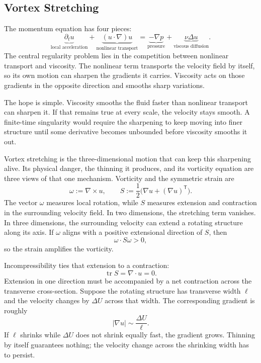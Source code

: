 
\subsection{Vortex Stretching}\label{sub:ThePerfectlyStretchingVortex}

The momentum equation has four pieces:
\[
  \underbrace{\partial_t u}_{\text{local acceleration}}
  +
  \underbrace{(u\cdot\nabla)u}_{\text{nonlinear transport}}
  =
  \underbrace{-\nabla p}_{\text{pressure}}
  +
  \underbrace{\nu\Delta u}_{\text{viscous diffusion}}.
\]
The central regularity problem lies in the competition between nonlinear transport and viscosity.
The nonlinear term transports the velocity field by itself, so its own motion can sharpen the gradients it carries.
Viscosity acts on those gradients in the opposite direction and smooths sharp variations.

The hope is simple.
Viscosity smooths the fluid faster than nonlinear transport can sharpen it.
If that remains true at every scale, the velocity stays smooth.
A finite-time singularity would require the sharpening to keep moving into finer structure until some derivative becomes unbounded before viscosity smooths it out.


Vortex stretching is the three-dimensional motion that can keep this sharpening alive.
Its physical danger, the thinning it produces, and its vorticity equation are three views of that one mechanism.
Vorticity and the symmetric strain are
\[
  \omega:=\nabla\times u,
  \qquad
  S:=\frac12\bigl(\nabla u+(\nabla u)^{\mathsf T}\bigr).
\]
The vector \(\omega\) measures local rotation, while \(S\) measures extension and contraction in the surrounding velocity field.
In two dimensions, the stretching term vanishes.
In three dimensions, the surrounding velocity can extend a rotating structure along its axis.
If \(\omega\) aligns with a positive extensional direction of \(S\), then
\[
  \omega\cdot S\omega>0,
\]
so the strain amplifies the vorticity.

Incompressibility ties that extension to a contraction:
\[
  \operatorname{tr}S=\nabla\cdot u=0.
\]
Extension in one direction must be accompanied by a net contraction across the transverse cross-section.
Suppose the rotating structure has transverse width \(\ell\) and the velocity changes by \(\Delta U\) across that width.
The corresponding gradient is roughly
\[
  |\nabla u|\sim\frac{\Delta U}{\ell}.
\]
If \(\ell\) shrinks while \(\Delta U\) does not shrink equally fast, the gradient grows.
Thinning by itself guarantees nothing; the velocity change across the shrinking width has to persist.


